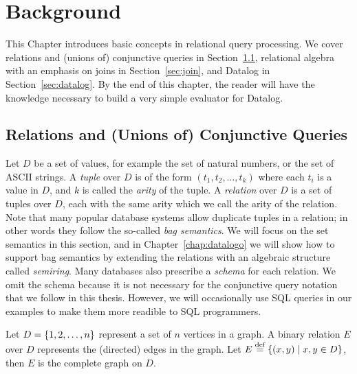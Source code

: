 \chapter{Background}
\label{sec:background}

This Chapter introduces basic concepts in relational query processing. 
We cover relations and (unions of) conjunctive queries in Section~\ref{sec:relations-and-conjunctive-queries},
 relational algebra with an emphasis on joins in Section~\ref{sec:join},
 and Datalog in Section~\ref{sec:datalog}.
By the end of this chapter, 
 the reader will have the knowledge necessary
 to build a very simple evaluator for Datalog.

\section{Relations and (Unions of) Conjunctive Queries}
\label{sec:relations-and-conjunctive-queries}

Let $D$ be a set of values, for example the set of natural numbers,
 or the set of ASCII strings.
A {\em tuple} over $D$ is of the form $(t_1, t_2, \ldots, t_k)$
 where each $t_i$ is a value in $D$,
 and $k$ is called the {\em arity} of the tuple.
A {\em relation} over $D$ is a set of tuples over $D$,
 each with the same arity which we call the arity of the relation.
Note that many popular database systems allow duplicate tuples in a relation;
 in other words they follow the so-called {\em bag semantics}.
We will focus on the set semantics in this section,
 and in Chapter~\ref{chap:datalogo} we will show how to
 support bag semantics by extending the relations
 with an algebraic structure called {\em semiring}.
Many databases also prescribe a {\em schema} for each relation.
We omit the schema because it is not necessary for the 
 conjunctive query notation that we follow in this thesis.
However, we will occasionally use SQL queries in our examples 
 to make them more readible to SQL programmers.

\begin{ex}
\label{ex:relation}
Let $D = \{1, 2, \ldots, n\}$ represent a set of $n$ vertices in a graph.
A binary relation $E$ over $D$ represents the (directed) edges in the graph.
Let $E \stackrel{\text{def}}{=} \{{(x, y)}\mid{x, y \in D}\}$, then $E$ is the complete graph on $D$.
\end{ex}

